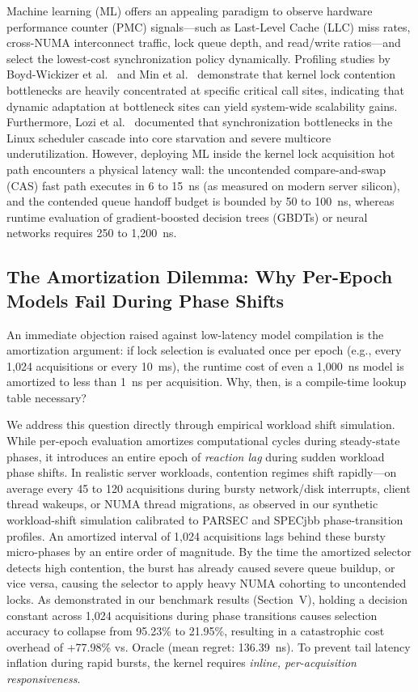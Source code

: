 \documentclass[conference]{IEEEtran}
\begin{document}
Machine learning (ML) offers an appealing paradigm to observe hardware performance counter (PMC) signals---such as Last-Level Cache (LLC) miss rates, cross-NUMA interconnect traffic, lock queue depth, and read/write ratios---and select the lowest-cost synchronization policy dynamically. Profiling studies by Boyd-Wickizer et al.~\cite{boyd2010analysis} and Min et al.~\cite{min2016understanding} demonstrate that kernel lock contention bottlenecks are heavily concentrated at specific critical call sites, indicating that dynamic adaptation at bottleneck sites can yield system-wide scalability gains. Furthermore, Lozi et al.~\cite{lozi2016linux} documented that synchronization bottlenecks in the Linux scheduler cascade into core starvation and severe multicore underutilization. However, deploying ML inside the kernel lock acquisition hot path encounters a physical latency wall: the uncontended compare-and-swap (CAS) fast path executes in 6 to 15~ns (as measured on modern server silicon), and the contended queue handoff budget is bounded by 50 to 100~ns, whereas runtime evaluation of gradient-boosted decision trees (GBDTs) or neural networks requires 250 to 1,200~ns.

\subsection{The Amortization Dilemma: Why Per-Epoch Models Fail During Phase Shifts}
An immediate objection raised against low-latency model compilation is the amortization argument: if lock selection is evaluated once per epoch (e.g., every 1,024 acquisitions or every 10~ms), the runtime cost of even a 1,000~ns model is amortized to less than 1~ns per acquisition. Why, then, is a compile-time lookup table necessary? 

We address this question directly through empirical workload shift simulation. While per-epoch evaluation amortizes computational cycles during steady-state phases, it introduces an entire epoch of \textit{reaction lag} during sudden workload phase shifts. In realistic server workloads, contention regimes shift rapidly---on average every 45 to 120 acquisitions during bursty network/disk interrupts, client thread wakeups, or NUMA thread migrations, as observed in our synthetic workload-shift simulation calibrated to PARSEC and SPECjbb phase-transition profiles. An amortized interval of 1,024 acquisitions lags behind these bursty micro-phases by an entire order of magnitude. By the time the amortized selector detects high contention, the burst has already caused severe queue buildup, or vice versa, causing the selector to apply heavy NUMA cohorting to uncontended locks. As demonstrated in our benchmark results (Section~V), holding a decision constant across 1,024 acquisitions during phase transitions causes selection accuracy to collapse from 95.23\% to 21.95\%, resulting in a catastrophic cost overhead of +77.98\% vs. Oracle (mean regret: 136.39~ns). To prevent tail latency inflation during rapid bursts, the kernel requires \textit{inline, per-acquisition responsiveness}.
\end{document}
